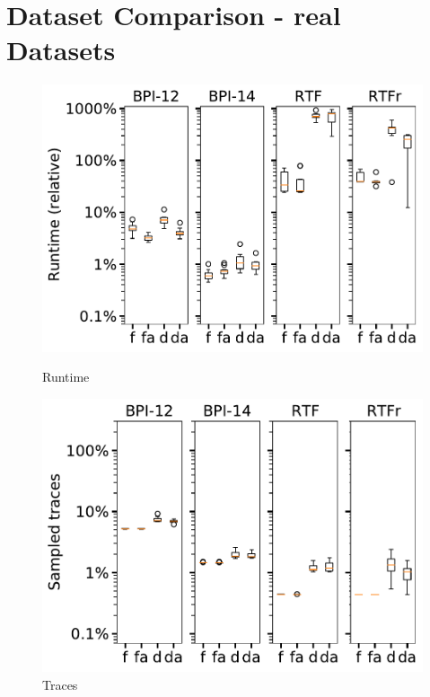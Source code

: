 \documentclass[landscape]{article}
\begin{document}
	\section*{Dataset Comparison - real Datasets}
		\begin{figure}[!htb]
		\centering
		\begin{minipage}{0.32\textwidth}
			\includegraphics[width=1.0\textwidth]{../real4_computing_time.pdf}
			\caption{Runtime}
		\end{minipage}
		\hfill
		\begin{minipage}{0.32\textwidth}
			\includegraphics[width=1.0\textwidth]{../real4_traces.pdf}
			\caption{Traces}
		\end{minipage}
		\hfill
		\begin{minipage}{0.32\textwidth}

\end{minipage}
\end{figure}
\end{document}

